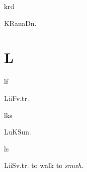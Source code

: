 \begin{multicols*}{2}
\begin{dictroot}{kr}{d}\label{root:KR_D}
    \begin{dictentry}{KRanaD}{n.}\label{word:KRanaD}
    \end{dictentry}
\end{dictroot}

\section*{L}

\begin{dictroot}{l}{f}
    \begin{dictentry}{LiiF}{v.tr.}
    \end{dictentry}
\end{dictroot}

\begin{dictroot}{l}{ks}
    \begin{dictentry}{LuKSu}{n.}
    \end{dictentry}
\end{dictroot}

\begin{dictroot}{l}{s}
    \begin{dictentry}{LiiS}{v.tr.}
        to walk to \textit{smwh.}
    \end{dictentry}
\end{dictroot}


\end{multicols*}
